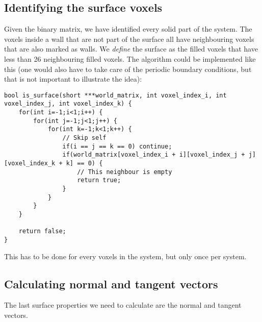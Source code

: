 \subsection{Identifying the surface voxels}
Given the binary matrix, we have identified every solid part of the system. The voxels inside a wall that are not part of the surface all have neighbouring voxels that are also marked as walls. We \textit{define} the surface as the filled voxels that have less than 26 neighbouring filled voxels. The algorithm could be implemented like this (one would also have to take care of the periodic boundary conditions, but that is not important to illustrate the idea):
\begin{lstlisting}
bool is_surface(short ***world_matrix, int voxel_index_i, int voxel_index_j, int voxel_index_k) {
	for(int i=-1;i<1;i++) {
    	for(int j=-1;j<1;j++) {
			for(int k=-1;k<1;k++) {
				// Skip self
				if(i == j == k == 0) continue; 
                if(world_matrix[voxel_index_i + i][voxel_index_j + j][voxel_index_k + k] == 0) {
                	// This neighbour is empty
                	return true;
                }
            }
        }
    }

    return false;
}
\end{lstlisting}
This has to be done for every voxels in the system, but only once per system.
\subsection{Calculating normal and tangent vectors}
The last surface properties we need to calculate are the normal and tangent vectors. 
